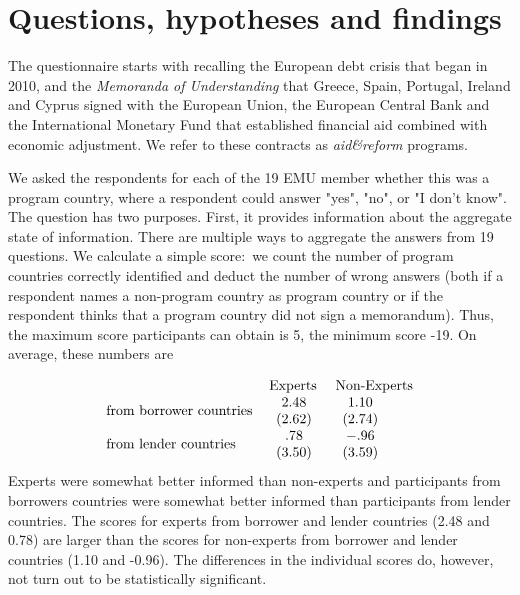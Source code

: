
\section{Questions, hypotheses and findings}

The questionnaire starts with recalling the European debt
crisis that began in 2010, and the \textit{Memoranda of Understanding}
that Greece, Spain, Portugal, Ireland and Cyprus signed with the European
Union, the European Central Bank and the International Monetary Fund that  
established financial aid combined with economic adjustment. We refer to
these contracts as \textit{aid\&reform} programs. 

We asked the respondents for each of the 19 EMU member whether
this was a program country, where a respondent could answer "yes",
"no", or "I don't know". The question has two purposes. First, it provides
information about the aggregate state of information. There are multiple
ways to aggregate the answers from 19 questions. %
We
calculate a simple score:\ we count the number of program countries
correctly identified and deduct the number of wrong answers (both if a
respondent names a non-program country as program country or if the
respondent thinks that a program country did not sign a memorandum). Thus, the maximum score participants can obtain is 5, the minimum score -19. On
average, these numbers are

\begin{equation*}
\begin{tabular}{lll}
& Experts & Non-Experts \\ 
from borrower countries & $%
\begin{array}{c}
2.48 \\ 
(2.62)%
\end{array}%
$ & $%
\begin{array}{c}
1.10 \\ 
(2.74)%
\end{array}%
$ \\ 
from lender countries & $%
\begin{array}{c}
.78 \\ 
(3.50)%
\end{array}%
$ & $%
\begin{array}{c}
-.96 \\ 
(3.59)%
\end{array}%
$%
\end{tabular}%
\end{equation*}%
Experts were somewhat better informed than non-experts and participants from borrowers countries were somewhat better informed than participants from lender countries. The scores for experts from borrower and lender countries (2.48 and 0.78) are larger than the scores for non-experts from borrower and lender countries (1.10 and -0.96). The differences in the individual scores do, however, not turn out to be statistically significant.

